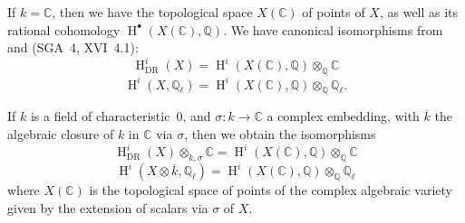 \documentclass{article}
\theoremstyle{definition}
\newenvironment{env}[1]
  {\renewcommand\theinnerenv{(#1)}\innerenv}
  {\endinnerenv}
\newcommand{\bb}{\mathbb}
\newcommand{\CC}{\bb{C}}
\newcommand{\QQ}{\bb{Q}}
\newcommand{\DR}{{\mathrm{DR}}}
\DeclareMathOperator{\HH}{H}
\begin{document}
\begin{env}{1.1}
  If $k=\CC$, then we have the topological space $X(\CC)$ of points of $X$, as well as its rational cohomology $\HH^\bullet(X(\CC),\QQ)$.
  We have canonical isomorphisms from \cite{G} and (SGA~4, XVI~4.1):
  \[
  \label{1.1.1}
    \HH_\DR^i(X) = \HH^i(X(\CC),\QQ)\otimes_{\QQ}\CC
  \tag{1.1.1}
  \]
  \[
  \label{1.1.2}
    \HH^i(X,\QQ_\ell) = \HH^i(X(\CC),\QQ)\otimes_{\QQ}\QQ_\ell.
  \tag{1.1.2}
  \]

  If $k$ is a field of characteristic~$0$, and $\sigma\colon k\to\CC$ a complex embedding, with $\overline{k}$ the algebraic closure of $k$ in $\CC$ via $\sigma$, then we obtain the isomorphisms
  \[
  \label{1.1.3}
    \HH_\DR^i(X)\otimes_{k,\sigma}\CC = \HH^i(X(\CC),\QQ)\otimes_{\QQ}\CC
  \tag{1.1.3}
  \]
  \[
  \label{1.1.4}
    \HH^i(X\otimes\overline{k},\QQ_\ell) = \HH^i(X(\CC),\QQ)\otimes_{\QQ}\QQ_\ell
  \tag{1.1.4}
  \]
  where $X(\CC)$ is the topological space of points of the complex algebraic variety given by the extension of scalars via $\sigma$ of $X$.
\end{env}



\nocite{*}
\end{document}
